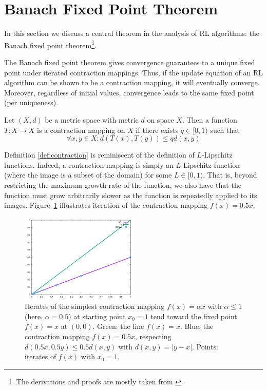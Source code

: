 \documentclass{article}
\begin{document}
\section{Banach Fixed Point Theorem}
In this section we discuss a central theorem in the analysis of RL algorithms: the Banach fixed point theorem\footnote{The derivations and proofs are mostly taken from \citet{wikipedia}}.

The Banach fixed point theorem gives convergence guarantees to a unique fixed point under iterated contraction mappings. Thus, if the update equation of an RL algorithm can be shown to be a contraction mapping, it will eventually converge. Moreover, regardless of initial values, convergence leads to the same fixed point (per uniqueness).

\begin{defn} \label{def:contraction}
Let $(X, d)$ be a metric space with metric $d$ on space $X$. Then a function $T : X \to X$ is a contraction mapping on $X$ if there exists $q\in [0, 1)$ such that
\begin{equation*}
    \forall x, y\in X : d(T(x), T(y)) \leq qd(x, y)
\end{equation*}
\end{defn}

Definition \ref{def:contraction} is reminiscent of the definition of $L$-Lipschitz functions. Indeed, a contraction mapping is simply an $L$-Lipschitz function (where the image is a subset of the domain) for some $L \in [0, 1)$. That is, beyond restricting the maximum growth rate of the function, we also have that the function must grow arbitrarily slower as the function is repeatedly applied to its images. Figure~\ref{fig:contract} illustrates iteration of the contraction mapping $f(x) = 0.5x$.

\begin{figure}
    \centering
    \includegraphics[width=0.5\textwidth]{banachiter.png}
    \caption{Iterates of the simplest contraction mapping $f(x) = \alpha x$ with $\alpha \leq 1$ (here, $\alpha = 0.5$) at starting point $x_0 = 1$ tend toward the fixed point $f(x) = x$ at $(0, 0)$. Green: the line $f(x) = x$. Blue: the contraction mapping $f(x) = 0.5x$, respecting $d(0.5x, 0.5y) \leq 0.5d(x, y)$ with $d(x, y) = |y - x|$. Points: iterates of $f(x)$ with $x_0 = 1$.}
    \label{fig:contract}
\end{figure}
\end{document}
